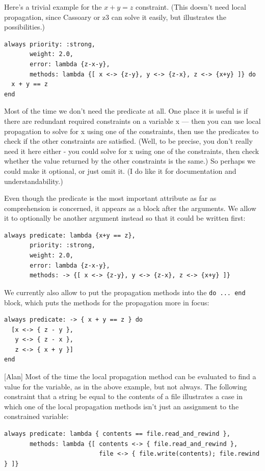 \documentclass[11pt]{article}
\begin{document}
Here's a trivial example for the $x+y=z$ constraint.  (This doesn't
need local propagation, since Cassoary or z3 can solve it easily, but
illustrates the possibilities.)

\begin{lstlisting}
always priority: :strong,
       weight: 2.0,
       error: lambda {z-x-y},
       methods: lambda {[ x <-> {z-y}, y <-> {z-x}, z <-> {x+y} ]} do
  x + y == z
end
\end{lstlisting}

Most of the time we don't need the predicate at all. One place it is
useful is if there are redundant required constraints on a variable x
--- then you can use local propagation to solve for x using one of the
constraints, then use the predicates to check if the other constraints
are satisfied.  (Well, to be precise, you don't really need it here
either - you could solve for x using one of the constraints, then
check whether the value returned by the other constraints is the
same.)  So perhaps we could make it optional, or just omit it. (I do
like it for documentation and understandability.)

Even though the predicate is the most important attribute as far as
comprehension is concerned, it appears as a block after the arguments.
We allow it to optionally be another argument instead so that it could
be written first:

\begin{lstlisting}
always predicate: lambda {x+y == z},
       priority: :strong,
       weight: 2.0,
       error: lambda {z-x-y},
       methods: -> {[ x <-> {z-y}, y <-> {z-x}, z <-> {x+y} ]}
\end{lstlisting}

We currently also allow to put the propagation methods into the
\lstinline{do ... end} block, which puts the methods for the
propagation more in focus:
\begin{lstlisting}
always predicate: -> { x + y == z } do
  [x <-> { z - y },
   y <-> { z - x },
   z <-> { x + y }]
end
\end{lstlisting}

[Alan] Most of the time the local propagation method can be evaluated
to find a value for the variable, as in the above example, but not
always. The following constraint that a string be equal to the
contents of a file illustrates a case in which one of the local
propagation methods isn't just an assignment to the constrained
variable:

\begin{lstlisting}
always predicate: lambda { contents == file.read_and_rewind },
       methods: lambda {[ contents <-> { file.read_and_rewind },
                          file <-> { file.write(contents); file.rewind } ]}
\end{lstlisting}
\end{document}
